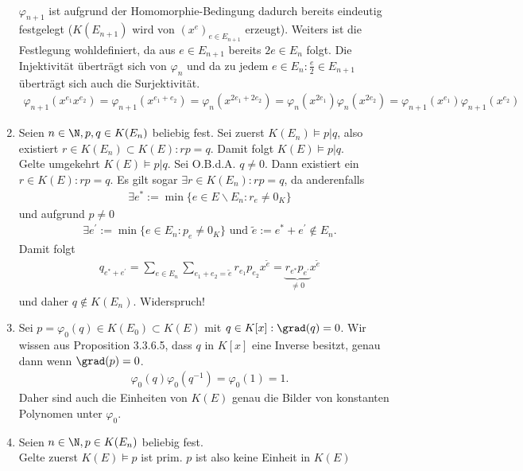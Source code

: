 \begin{solution}
\begin{enumerate}
\begin{align*}
  \end{align*}
  $\varphi_{n+1}$ ist aufgrund der Homomorphie-Bedingung dadurch bereits eindeutig
  festgelegt ($K(E_{n+1})$ wird von $(x^e)_{e \in E_{n+1}}$ erzeugt). Weiters ist die Festlegung wohldefiniert, da aus $e \in E_{n+1}$
bereits $2e \in E_n$ folgt. Die Injektivität überträgt sich von $\varphi_n$ und da zu jedem $e \in E_n: \frac{e}{2} \in E_{n+1}$
überträgt sich auch die Surjektivität.
  \begin{align*}
    \varphi_{n+1}(x^{e_1}x^{e_2}) = \varphi_{n+1}(x^{e_1 + e_2}) = \varphi_n(x^{2e_1 + 2e_2})
    = \varphi_n(x^{2e_1})\varphi_n(x^{2e_2}) = \varphi_{n+1}(x^{e_1})\varphi_{n+1}(x^{e_2})
  \end{align*}
  \item Seien $n \in \N, p,q \in K(E_n)$ beliebig fest.
  Sei zuerst $K(E_n) \vDash p|q$, also existiert $r \in K(E_n) \subset K(E): rp = q$.
  Damit folgt $ K(E) \vDash p|q$. \\
  Gelte umgekehrt $K(E) \vDash p | q$. Sei O.B.d.A. $q \neq 0$.
  Dann existiert ein $r \in K(E): rp = q $.
  Es gilt sogar $\exists r \in K(E_n): rp = q$, da anderenfalls
  \begin{align*}
    \exists e^* := \min \{e \in E\backslash E_n: r_e \neq 0_K\}
  \end{align*}
  und aufgrund $p \neq 0$
  \begin{align*}
    \exists e^{\prime} := \min \{e \in E_n: p_e \neq 0_K\} \text{ und }
    \widetilde{e} := e^* + e^{\prime} \notin E_n.
  \end{align*}
  Damit folgt
  \begin{align*}
    q_{e^* + e^{\prime}} = \sum_{e \in E_n}\sum_{e_1 + e_2 = \widetilde{e}}r_{e_1}p_{e_2}x^{\widetilde{e}}
    = \underbrace{r_{e^*}p_{e^{\prime}}}_{\neq 0}x^{\widetilde{e}}
  \end{align*}
  und daher $q \notin K(E_n)$. Widerspruch!
  \item Sei $p = \varphi_0(q) \in K(E_0) \subset K(E)$ mit $q \in K[x]: \grad(q) = 0$.
  Wir wissen aus Proposition 3.3.6.5, dass $q$ in $K[x]$ eine Inverse besitzt, genau
  dann wenn $\grad(p) = 0$.
  \begin{align*}
    \varphi_0(q)\varphi_0(q^{-1}) = \varphi_0(1) = 1.
  \end{align*}
  Daher sind auch die Einheiten von $K(E)$ genau die Bilder von konstanten Polynomen
  unter $\varphi_0$.
  \item Seien $n \in \N, p \in K(E_n)$ beliebig fest. \\
  Gelte zuerst $K(E) \vDash p$ ist prim. $p$ ist also keine Einheit in $K(E)$

\end{enumerate}
\end{solution}
